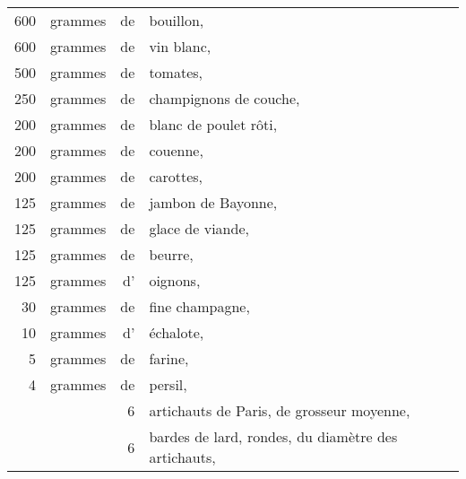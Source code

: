 \footnotesize
\begin{longtable}{rrrp{18em}}
    600 & grammes & de & bouillon,                                                                        \\
    600 & grammes & de & vin blanc,                                                                       \\
    500 & grammes & de & tomates,                                                                         \\
    250 & grammes & de & champignons de couche,                                                           \\
    200 & grammes & de & blanc de poulet rôti,                                                            \\
    200 & grammes & de & couenne,                                                                         \\
    200 & grammes & de & carottes,                                                                        \\
    125 & grammes & de & jambon de Bayonne,                                                               \\
    125 & grammes & de & glace de viande,                                                                 \\
    125 & grammes & de & beurre,                                                                          \\
    125 & grammes & d' & oignons,                                                                         \\
     30 & grammes & de & fine champagne,                                                                  \\
     10 & grammes & d' & échalote,                                                                        \\
      5 & grammes & de & farine,                                                                          \\
      4 & grammes & de & persil,                                                                          \\
        &         &  6 & artichauts de Paris, de grosseur moyenne,                                        \\
        &         &  6 & bardes de lard, rondes, du diamètre des artichauts,                              \\

\end{longtable}
